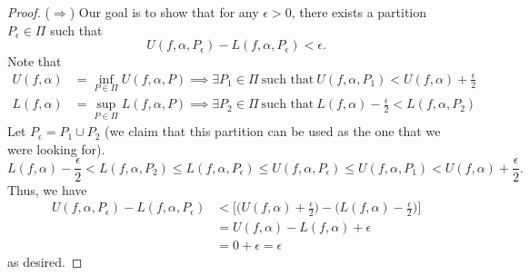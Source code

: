 \begin{proof}
    (\( \Longrightarrow \)) Our goal is to show that for any \(  \epsilon > 0  \), there exists a partition \( {P}_{\epsilon} \in \Pi \) such that 
    \[  U(f,\alpha,{P}_{\epsilon}) - L(f,\alpha, {P}_{\epsilon}) < \epsilon.  \]
    Note that 
    \begin{align*}
        U(f,\alpha)  &= \inf_{P \in \Pi} U(f,\alpha, P) \implies \exists {P}_{1} \in \Pi \ \text{such that} \ U(f,\alpha, {P}_{1}) < U(f,\alpha) + \frac{ \epsilon }{ 2 }  \\
        L(f,\alpha) &= \sup_{P \in \Pi} L(f,\alpha,P) \implies \exists {P}_{2} \in \Pi \ \text{such that} \ L(f,\alpha) - \frac{ \epsilon }{ 2 }  < L(f,\alpha, {P}_{2})
    \end{align*}
    Let \( {P}_{\epsilon} = {P}_{1} \cup {P}_{2} \) (we claim that this partition can be used as the one that we were looking for).
    \[  L(f,\alpha) - \frac{ \epsilon }{ 2 }  < L(f,\alpha, {P}_{2}) \leq L(f,\alpha, {P}_{\epsilon}) \leq U(f,\alpha,{P}_{\epsilon}) \leq U(f,\alpha, {P}_{1}) < U(f,\alpha) + \frac{ \epsilon }{ 2 }. \]
    Thus, we have
    \begin{align*}
        U(f,\alpha, {P}_{\epsilon}) - L(f,\alpha, {P}_{\epsilon}) &< \Big[ \Big( U(f,\alpha) + \frac{ \epsilon }{ 2 }  \Big) - \Big(  L(f,\alpha) - \frac{ \epsilon }{ 2 }  \Big) \Big] \\
                                                                  &= U(f,\alpha) - L(f,\alpha) + \epsilon \\
                                                                  &= 0 + \epsilon = \epsilon
    \end{align*}
    as desired.
\end{proof}

